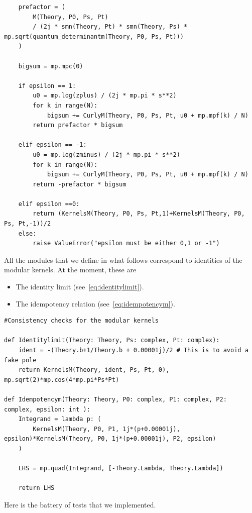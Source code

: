 \documentclass[11pt]{article}
\begin{document}
\begin{lstlisting}
    prefactor = (
        M(Theory, P0, Ps, Pt)
        / (2j * smn(Theory, Pt) * smn(Theory, Ps) * mp.sqrt(quantum_determinantm(Theory, P0, Ps, Pt)))
    )

    bigsum = mp.mpc(0)

    if epsilon == 1:
        u0 = mp.log(zplus) / (2j * mp.pi * s**2)
        for k in range(N):
            bigsum += CurlyM(Theory, P0, Ps, Pt, u0 + mp.mpf(k) / N)
        return prefactor * bigsum

    elif epsilon == -1:
        u0 = mp.log(zminus) / (2j * mp.pi * s**2)
        for k in range(N):
            bigsum += CurlyM(Theory, P0, Ps, Pt, u0 + mp.mpf(k) / N)
        return -prefactor * bigsum
    
    elif epsilon ==0:
        return (KernelsM(Theory, P0, Ps, Pt,1)+KernelsM(Theory, P0, Ps, Pt,-1))/2
    else:
        raise ValueError("epsilon must be either 0,1 or -1")
\end{lstlisting}
All the modules that we define in what follows correspond to identities of the modular kernels. At the moment, these are
\begin{itemize}
    \item The identity limit (see~\eqref{eq:identitylimit}).
    \item The idempotency relation (see~\eqref{eq:idempotencym}).
\end{itemize}
\begin{lstlisting}
#Consistency checks for the modular kernels

def Identitylimit(Theory: Theory, Ps: complex, Pt: complex):
    ident = -(Theory.b+1/Theory.b + 0.00001j)/2 # This is to avoid a fake pole
    return KernelsM(Theory, ident, Ps, Pt, 0), mp.sqrt(2)*mp.cos(4*mp.pi*Ps*Pt)

def Idempotencym(Theory: Theory, P0: complex, P1: complex, P2: complex, epsilon: int ):
    Integrand = lambda p: (
        KernelsM(Theory, P0, P1, 1j*(p+0.00001j), epsilon)*KernelsM(Theory, P0, 1j*(p+0.00001j), P2, epsilon)
    )

    LHS = mp.quad(Integrand, [-Theory.Lambda, Theory.Lambda])

    return LHS
\end{lstlisting}
Here is the battery of tests that we implemented.
\end{document}
